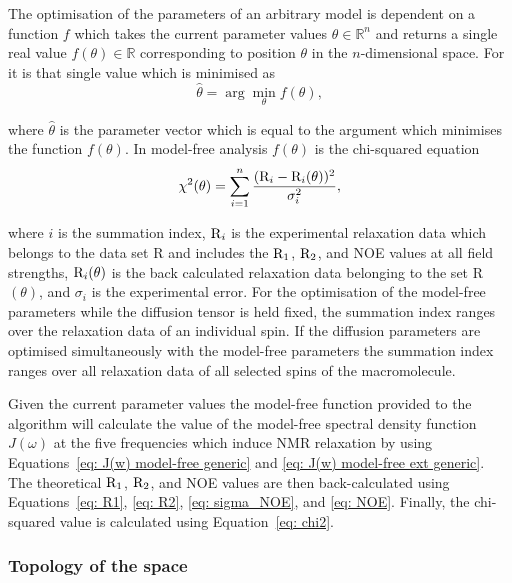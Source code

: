 \begin{htmlonly}
\begin{htmlonly}
The optimisation of the parameters of an arbitrary model is dependent on a function $f$ which takes the current parameter values $\theta \in \mathbb{R}^n$ and returns a single real value $f(\theta) \in \mathbb{R}$ corresponding to position $\theta$ in the $n$-dimensional space.  For it is that single value which is minimised as
\begin{equation}
 \hat\theta = \arg \min_\theta f(\theta),
\end{equation}

\noindent where $\hat\theta$ is the parameter vector which is equal to the argument which minimises the function $f(\theta)$.  In model-free analysis $f(\theta)$ is the chi-squared equation
\begin{equation} \label{eq: chi2}
 \chi^2(\theta) = \sum_{i=1}^n \frac{(\mathrm{R}_i - \mathrm{R}_i(\theta))^2}{\sigma_i^2},
\end{equation}

\noindent where $i$ is the summation index, $\mathrm{R}_i$ is the experimental relaxation data which belongs to the data set R and includes the $\mathrm{R}_1$, $\mathrm{R}_2$, and NOE values at all field strengths, $\mathrm{R}_i(\theta)$ is the back calculated relaxation data belonging to the set R$(\theta)$, and $\sigma_i$ is the experimental error.  For the optimisation of the model-free parameters while the diffusion tensor is held fixed, the summation index ranges over the relaxation data of an individual spin.  If the diffusion parameters are optimised simultaneously with the model-free parameters the summation index ranges over all relaxation data of all selected spins of the macromolecule.

Given the current parameter values the model-free function provided to the algorithm will calculate the value of the model-free spectral density function $J(\omega)$ at the five frequencies which induce NMR relaxation by using Equations~\eqref{eq: J(w) model-free generic} and \eqref{eq: J(w) model-free ext generic}.  The theoretical $\mathrm{R}_1$, $\mathrm{R}_2$, and NOE values are then back-calculated using Equations~\eqref{eq: R1}, \eqref{eq: R2}, \eqref{eq: sigma_NOE}, and \eqref{eq: NOE}.  Finally, the chi-squared value is calculated using Equation~\eqref{eq: chi2}.


\subsubsection{Topology of the space}


\end{htmlonly}
\end{htmlonly}
